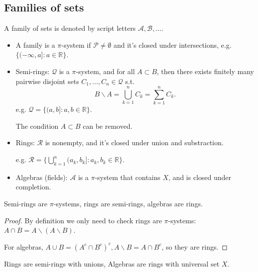 \subsection{Families of sets}
\label{sub:Families of sets}
\begin{definition}
	A family of sets is denoted by script letters $\mathscr{A},\mathscr{B},\dots$.

	\begin{itemize}
		\item A family is a $\pi$-system if  $\mathscr{P}\ne \emptyset$ and
			it's closed under intersections, e.g.
			$\{(-\infty, a]: a\in \mathbb{R}\}$.
		\item Semi-rings: $\mathscr{Q}$ is a $\pi$-system, and for all
			$A \subset B$, then there exists finitely many pairwise disjoint sets
			$C_1,\dots,C_n\in \mathscr{Q}$ s.t.
			\[
			B\backslash A = \bigcup_{k=1}^n C_k = \sum_{k=1}^n C_k.
			\]
			e.g. $\mathscr{Q}= \{(a,b]:a,b\in \mathbb{R}\}$.
			\begin{remark}
				The condition $A \subset B$ can be removed.
			\end{remark}
		\item Rings: $\mathscr{R}$ is nonempty, and it's closed under
			union and substraction.

			e.g. $\mathscr{R} = \{\bigcup_{k=1}^n (a_k,b_k]:a_k,b_k\in \mathbb{R}\}$.
		\item Algebras (fields): $\mathscr{A}$ is a $\pi$-system that contains
			$X$, and is closed under completion.
	\end{itemize}
\end{definition}

\begin{proposition}
	Semi-rings are $\pi$-systems, rings are semi-rings, algebras are rings.
\end{proposition}
\begin{proof}[Proof]
    By definition we only need to check rings are $\pi$-systems:
	$A\cap B = A\backslash (A\backslash B)$.

	For algebras, $A\cup B = (A^c\cap B^c)^c, A\backslash B = A\cap B^c$,
	so they are rings.
\end{proof}
\begin{remark}
    Rings are semi-rings with unions, Algebras are rings with universal set $X$.
\end{remark}

